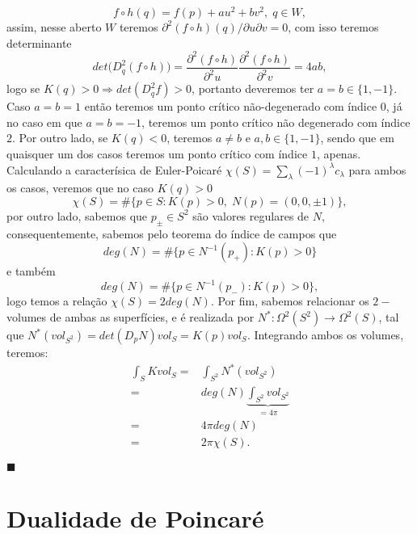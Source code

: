 \documentclass{article}
\begin{document}
	$$
	f \circ h (q) = f (p) + au^{2} + b v^{2}, \; q \in W,  
	$$
	assim, nesse aberto $W$ teremos $\partial^{2}(f\circ h)(q)/\partial u \partial v = 0$, com isso teremos  determinante 
	$$
	det \Big(D_{q}^{2}(f\circ h) \Big) = \frac{\partial^{2}(f\circ h)}{\partial^{2}u}\frac{\partial^{2}(f\circ h)}{\partial^{2}v} = 4ab,
	$$
	logo se $K(q) > 0 \Rightarrow det(D_{q}^{2}f) > 0$, portanto deveremos ter $a = b \in \{1, -1\}$. Caso $a = b = 1$ então teremos um ponto crítico não-degenerado com índice $0$, já no caso em que $a=b=-1$, teremos um ponto crítico não degenerado com índice $2$. Por outro lado, se $K(q) < 0$, teremos $a \neq b $ e $a, b \in \{1, -1\}$, sendo que em quaisquer um dos casos teremos um ponto crítico com índice $1$, apenas. Calculando a caracterísica de Euler-Poicaré $\chi(S) = \sum_{\lambda}(-1)^{\lambda}c_{\lambda}$ para ambos os casos, veremos que no caso $K(q) > 0$
	$$
	\chi(S) = \#\{p \in S: K(p)>0, \; N(p) = (0,0,\pm 1)\},
	$$
	por outro lado, sabemos que $p_{\pm} \in S^{2}$ são valores regulares de $N$, consequentemente, sabemos pelo teorema do índice de campos que
	$$
	deg(N) = \#\{p \in N^{-1}(p_{+} ): K(p)>0 \}
	$$
	e também 
	$$
	deg(N) = \#\{p \in N^{-1}(p_{-} ): K(p)>0 \},
	$$
	logo temos a relação $\chi(S) = 2 deg(N)$. Por fim, sabemos relacionar os $2-$volumes de ambas as superfícies, e é realizada por $N^{*} : \Omega^{2}(S^{2}) \to \Omega^{2}(S)$, tal que $N^{*}(vol_{S^{2}}) = det(D_{p}N)vol_{S} = K(p)vol_{S}$. Integrando ambos os volumes, teremos:
	$$
	\begin{aligned}
	\int_{S}Kvol_{S} =& \int_{S^{2}}N^{*}(vol_{S^{2}}) 
	\\
	=& deg(N) \underbrace{\int_{S^{2}}vol_{S^{2}} }_{= 4\pi}
	\\
	=& 4\pi deg(N)
	\\
	=& 2\pi \chi(S).
	\end{aligned}
	$$
	
	$\blacksquare$
	
	\section{Dualidade de Poincaré}
	
\end{document}
